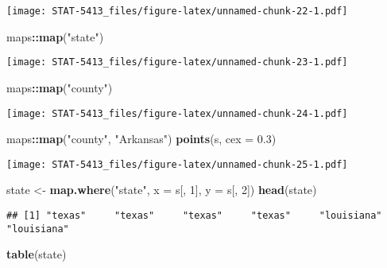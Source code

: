 \documentclass[]{book}
\newenvironment{Shaded}{\begin{snugshade}}{\end{snugshade}}
\newcommand{\DataTypeTok}[1]{\textcolor[rgb]{0.13,0.29,0.53}{#1}}
\newcommand{\DecValTok}[1]{\textcolor[rgb]{0.00,0.00,0.81}{#1}}
\newcommand{\FloatTok}[1]{\textcolor[rgb]{0.00,0.00,0.81}{#1}}
\newcommand{\KeywordTok}[1]{\textcolor[rgb]{0.13,0.29,0.53}{\textbf{#1}}}
\newcommand{\NormalTok}[1]{#1}
\newcommand{\OperatorTok}[1]{\textcolor[rgb]{0.81,0.36,0.00}{\textbf{#1}}}
\newcommand{\StringTok}[1]{\textcolor[rgb]{0.31,0.60,0.02}{#1}}
\begin{document}
\texttt{[image: STAT-5413\_files/figure-latex/unnamed-chunk-22-1.pdf]}

\begin{Shaded}
\begin{Highlighting}[]
\NormalTok{maps}\OperatorTok{::}\KeywordTok{map}\NormalTok{(}\StringTok{"state"}\NormalTok{)}
\end{Highlighting}
\end{Shaded}

\texttt{[image: STAT-5413\_files/figure-latex/unnamed-chunk-23-1.pdf]}

\begin{Shaded}
\begin{Highlighting}[]
\NormalTok{maps}\OperatorTok{::}\KeywordTok{map}\NormalTok{(}\StringTok{"county"}\NormalTok{)}
\end{Highlighting}
\end{Shaded}

\texttt{[image: STAT-5413\_files/figure-latex/unnamed-chunk-24-1.pdf]}

\begin{Shaded}
\begin{Highlighting}[]
\NormalTok{maps}\OperatorTok{::}\KeywordTok{map}\NormalTok{(}\StringTok{"county"}\NormalTok{, }\StringTok{"Arkansas"}\NormalTok{)}
\KeywordTok{points}\NormalTok{(s, }\DataTypeTok{cex =} \FloatTok{0.3}\NormalTok{)}
\end{Highlighting}
\end{Shaded}

\texttt{[image: STAT-5413\_files/figure-latex/unnamed-chunk-25-1.pdf]}

\begin{Shaded}
\begin{Highlighting}[]
\NormalTok{state <-}\StringTok{ }\KeywordTok{map.where}\NormalTok{(}\StringTok{"state"}\NormalTok{, }\DataTypeTok{x =}\NormalTok{ s[, }\DecValTok{1}\NormalTok{], }\DataTypeTok{y =}\NormalTok{ s[, }\DecValTok{2}\NormalTok{])}
\KeywordTok{head}\NormalTok{(state)}
\end{Highlighting}
\end{Shaded}

\begin{verbatim}
## [1] "texas"     "texas"     "texas"     "texas"     "louisiana" "louisiana"
\end{verbatim}

\begin{Shaded}
\begin{Highlighting}[]
\KeywordTok{table}\NormalTok{(state)}
\end{Highlighting}
\end{Shaded}
\end{document}
